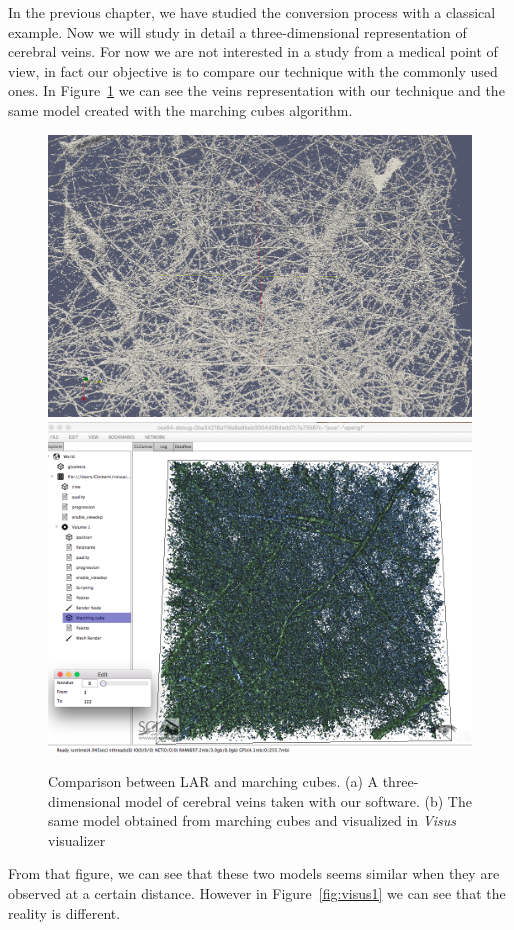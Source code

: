 In the previous chapter, we have studied the conversion process with a classical example. Now we will study in detail a three-dimensional representation of cerebral veins. For now we are not interested in a study from a medical point of view, in fact our objective is to compare our technique with the commonly used ones. In Figure~\ref{fig:visus0} we can see the veins representation with our technique and the same model created with the marching cubes algorithm.

\begin{figure}[htb] %
   \centering
   \includegraphics[width=0.49\linewidth]{images/LAR0.png}\hfill
   \includegraphics[width=0.49\linewidth]{images/visus0.png}
   \caption[Comparison between LAR and marching cubes]{Comparison between LAR and marching cubes. (a) A three-dimensional model of cerebral veins taken with our software. (b) The same model obtained from marching cubes and visualized in \textit{Visus} visualizer}
   \label{fig:visus0}
\end{figure}


From that figure, we can see that these two models seems similar when they are observed at a certain distance. However in Figure~\ref{fig:visus1} we can see that the reality is different.


